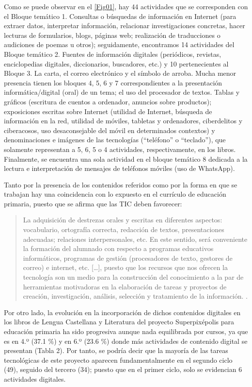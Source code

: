 \documentclass{textolivre}
\begin{document}
Como se puede observar en el \cref{Fig01}, hay 44 actividades que se corresponden con el Bloque temático 1. Consultas o búsquedas de información en Internet (para extraer datos, interpretar información, relacionar investigaciones concretas, hacer lecturas de formularios, blogs, páginas web; realización de traducciones o audiciones de poemas u otros); seguidamente, encontramos 14 actividades del Bloque temático 2. Fuentes de información digitales (periódicos, revistas, enciclopedias digitales, diccionarios, buscadores, etc.) y 10 pertenecientes al Bloque 3. La carta, el correo electrónico y el símbolo de arroba. Mucha menor presencia tienen los bloques 4, 5, 6 y 7 correspondientes a la presentación informática/digital (oral) de un tema; el uso del procesador de textos. Tablas y gráficos (escritura de cuentos a ordenador, anuncios sobre productos); exposiciones escritas sobre Internet (utilidad de Internet, búsqueda de información en la red, utilidad de móviles, tabletas y ordenadores, ciberdelitos y ciberacosos, uso desaconsejable del móvil en determinados contextos) y denominaciones e imágenes de las tecnologías (“teléfono” o “teclado”), que solamente representan a 5, 6, 5 o 4 actividades, respectivamente, en los libros. Finalmente, se encuentra una sola actividad en el bloque temático 8 dedicada a la lectura e interpretación de mensajes de teléfonos móviles (uso de WhatsApp). 

Tanto por la presencia de los contenidos referidos como por la forma en que se trabajan hay una coincidencia con lo expuesto en el currículo de educación primaria, puesto que se afirma que las TIC deben favorecer:  

\begin{quote}
    La adquisición de destrezas orales y escritas en diferentes aspectos: vocabulario, ortografía correcta, redacción de textos, presentaciones adecuadas; relaciones interpersonales, etc. En este sentido, será conveniente la formación del alumnado con respecto a programas educativos informáticos, programas de gestión (procesadores de texto, gestores de correo) e internet, etc. […], puesto que los recursos que nos ofrecen la tecnología son un medio para la construcción del conocimiento a la par de herramientas motivadoras en la elaboración de tareas y proyectos de creación, investigación, análisis, selección y tratamiento de la información. \cite[p. 153]{junta_de_andalucia_orden_2015}.
\end{quote}

Por otro lado, la evolución en la incorporación de dichos contenidos digitales en los libros de Lengua Castellana y Literatura del proyecto Superpixépolis para educación primaria ha sido progresiva aunque nada equilibrada por cursos, ya que es en 4.º (37.1 \%) y en 6.º (23.6 \%) donde más actividades de contenido digital se presentan (Tabla 2). Por tanto, se podría decir que la mayoría de las tareas tecnológicas de este proyecto aparecen fundamentalmente en el segundo ciclo (49), seguido del tercero (34); puesto que en el primer ciclo, solo se evidencian 6 actividades digitales.
\end{document}
